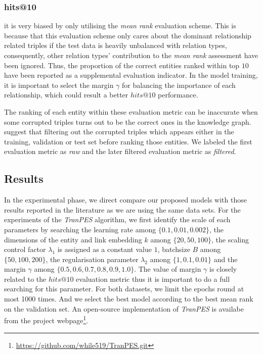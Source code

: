\documentclass[10pt,journal]{IEEEtran}
\begin{document}
\subsubsection{hits@10} it is very biased by only utilising the \emph{mean rank} evaluation scheme. This is because that this evaluation scheme only cares about the dominant relationship related triples if the test data is heavily unbalanced with relation types, consequently,  other relation types' contribution to the \emph{mean rank} assessment have been ignored.  Thus, the proportion of the correct entities ranked within top $10$ have been reported as a supplemental evaluation indicator. In the model training, it is important to select the margin $\gamma$ for balancing the importance of each relationship, which could result a better $hits@10$ performance. 

The ranking of each entity within these evaluation metric can be inaccurate when some corrupted triples turns out to be the correct ones in the knowledge graph. \cite{bordes_translating_2013} suggest that filtering out the corrupted triples which appears either in the training, validation or test set before ranking those entities.  We labeled the first evaluation metric as \emph{raw} and the later filtered evaluation metric as \emph{filtered}.


\subsection{Results}
In the experimental phase, we direct compare our proposed models with those results reported in the literature  \cite{lin_learning_2015} as we are using the same data sets. For the experiments of the \emph{TranPES} algorithm, we first identify the scale of each parameters by searching the learning rate among $\{ 0.1, 0.01, 0.002\}$, the dimensions of the entity and link embedding $k$ among $\{ 20, 50, 100 \}$, the scaling control factor $\lambda_1$ is assigned as a constant value $1$, batchsize $B$ among $\{50, 100, 200\}$, the regularisation parameter $\lambda_2$ among $\{ 1, 0.1, 0.01\}$ and the margin $\gamma$ among $\{0.5, 0.6, 0.7, 0.8, 0.9, 1.0\}$. The value of margin $\gamma$ is closely related to the $hits@10$ evaluation metric thus it is important to do a full searching for this parameter. For both datasets, we limit the epochs round at most 1000 times.  And we select the best model according to the best mean rank on the validation set. An open-source implementation of \emph{TranPES} is availabe from the project webpage\footnote{\url{https://github.com/while519/TranPES.git}}.
\end{document}
